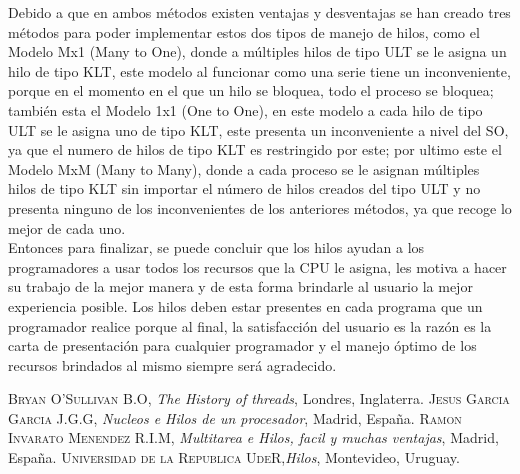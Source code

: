 \documentclass{article}
\begin{document}
Debido a que en ambos métodos existen ventajas y desventajas se han creado tres métodos para poder implementar estos dos tipos de manejo de hilos, como el Modelo Mx1 (Many to One), \cite{Uni} donde a múltiples hilos de tipo ULT se le asigna un hilo de tipo KLT, este modelo al funcionar como una serie tiene un inconveniente, porque en el momento en el que un hilo se bloquea, todo el proceso se bloquea; también esta el Modelo 1x1 (One to One), \cite{Uni} en este modelo a cada hilo de tipo ULT se le asigna uno de tipo KLT, este presenta un inconveniente a nivel del SO, ya que el numero de hilos de tipo KLT es restringido por este; por ultimo este el Modelo MxM (Many to Many), \cite{Uni} donde a cada proceso se le asignan múltiples hilos de tipo KLT sin importar el número de hilos creados del tipo ULT y no presenta ninguno de los inconvenientes de los anteriores métodos, ya que recoge lo mejor de cada uno.\\

Entonces para finalizar, se puede concluir que los hilos ayudan a los programadores a usar todos los recursos que la CPU le asigna, les motiva a hacer su trabajo de la mejor manera y de esta forma brindarle al usuario la mejor experiencia posible. Los hilos deben estar presentes en cada programa que un programador realice porque al final, la satisfacción del usuario es la razón es la carta de presentación para cualquier programador y el manejo óptimo de los recursos brindados al mismo siempre será agradecido.\\








\newpage


\begin{thebibliography}{X}
 \textsc{Bryan O'Sullivan B.O},
\textit{The History of threads}, Londres, Inglaterra.
 \textsc{Jesus Garcia Garcia J.G.G},
\textit{ Nucleos e Hilos de un procesador}, Madrid, España.
 \textsc{Ramon Invarato Menendez R.I.M},\textit{ Multitarea e Hilos, facil y muchas ventajas}, Madrid, España.
 \textsc{Universidad de la Republica UdeR},\textit{Hilos}, Montevideo, Uruguay.

\end{thebibliography}
\end{document}
